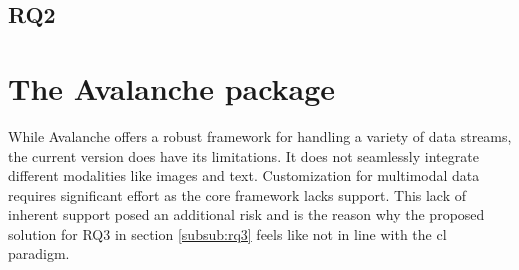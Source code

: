 \subsection{RQ2}
\section{The Avalanche package}
While Avalanche \citep{lomonaco2021avalanche} offers a robust framework for handling a variety of data streams, the current version does have its limitations. It does not seamlessly integrate different modalities like images and text. Customization for multimodal data requires significant effort as the core framework lacks support. This lack of inherent support posed an additional risk and is the reason why the proposed solution for RQ3 in section \ref{subsub:rq3} feels like not in line with the \acrshort{cl} paradigm. \\
